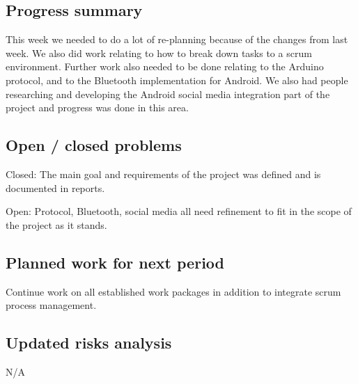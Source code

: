 \subsection{Progress summary}
This week we needed to do a lot of re-planning because of the changes from last week. We also did work relating to how to break down tasks to a scrum environment. Further work also needed to be done relating to the Arduino protocol, and to the Bluetooth implementation for Android. We also had people researching and developing the Android social media integration part of the project and progress was done in this area.

\subsection{Open / closed problems}
Closed: The main goal and requirements of the project was defined and is documented in reports.

Open:
Protocol, Bluetooth, social media all need refinement to fit in the scope of the project as it stands.


\subsection{Planned work for next period}
Continue work on all established work packages in addition to integrate scrum process management.

\subsection{Updated risks analysis}
N/A